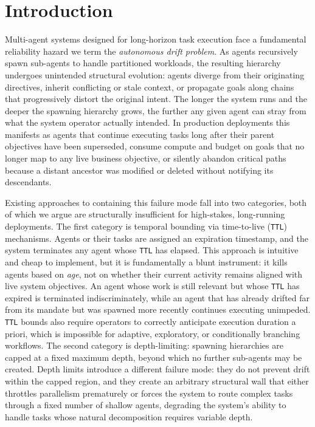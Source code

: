 \section{Introduction}

Multi-agent systems designed for long-horizon task execution face a fundamental reliability hazard we term the \textit{autonomous drift problem}. As agents recursively spawn sub-agents to handle partitioned workloads, the resulting hierarchy undergoes unintended structural evolution: agents diverge from their originating directives, inherit conflicting or stale context, or propagate goals along chains that progressively distort the original intent. The longer the system runs and the deeper the spawning hierarchy grows, the further any given agent can stray from what the system operator actually intended. In production deployments this manifests as agents that continue executing tasks long after their parent objectives have been superseded, consume compute and budget on goals that no longer map to any live business objective, or silently abandon critical paths because a distant ancestor was modified or deleted without notifying its descendants.

Existing approaches to containing this failure mode fall into two categories, both of which we argue are structurally insufficient for high-stakes, long-running deployments. The first category is temporal bounding via time-to-live (\texttt{TTL}) mechanisms. Agents or their tasks are assigned an expiration timestamp, and the system terminates any agent whose \texttt{TTL} has elapsed. This approach is intuitive and cheap to implement, but it is fundamentally a blunt instrument: it kills agents based on \textit{age}, not on whether their current activity remains aligned with live system objectives. An agent whose work is still relevant but whose \texttt{TTL} has expired is terminated indiscriminately, while an agent that has already drifted far from its mandate but was spawned more recently continues executing unimpeded. \texttt{TTL} bounds also require operators to correctly anticipate execution duration a priori, which is impossible for adaptive, exploratory, or conditionally branching workflows. The second category is depth-limiting: spawning hierarchies are capped at a fixed maximum depth, beyond which no further sub-agents may be created. Depth limits introduce a different failure mode: they do not prevent drift within the capped region, and they create an arbitrary structural wall that either throttles parallelism prematurely or forces the system to route complex tasks through a fixed number of shallow agents, degrading the system's ability to handle tasks whose natural decomposition requires variable depth.

